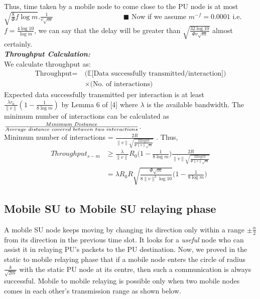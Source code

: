 \documentclass[conference]{IEEEtran}
\begin{document}
Thus, time taken by a mobile node to come close to the PU node is at most $\sqrt{\frac{8}{\Phi}f\log m}.\frac{1}{v\sqrt{m}}\quad\quad\quad\quad\quad\quad\quad\quad\quad\quad\blacksquare$ Now 
if we assume $m^{-f}=0.0001$ i.e.$f=\frac{4\log 10}{\log m}$, we can say that the delay will be greater than $\sqrt{\frac{32\log 10}{\Phi v \sqrt{m}}}$ almost certainly.\\
\emph{\bf Throughput Calculation:}\\
We calculate throughput as:
\vspace{-2mm}
\begin{align*}
\mbox{Throughput}=\ &(\mathbb{E}[\mbox{Data successfully transmitted/interaction])}\\
\ &\times\mbox{(No. of interactions)}
\end{align*}
Expected data successfully transmitted per interaction is at least $\frac{\lambda r_0}{\|v\|}(1-\frac{1}{8\log m})$ by Lemma 6 of [4] where $\lambda$ is the available bandwidth. The minimum 
number of interactions can be calculated as $\frac{Minimum\hspace{1mm}Distance}{Average\hspace{1mm}distance\hspace{1mm}covered\hspace{1mm}between\hspace{1mm}two\hspace{1mm}interactions}$.
\\Minimum number of interactions = $\frac{2R}{{\|v\|}\sqrt{\frac{32log 10}{\Phi{\|v\|} \sqrt{m}}}}$ . Thus,
\begin{align*}
Throughput_{s-m}&\geq\frac{\lambda}{\|v\|}R_0\big(1-\frac{1}{8\log m}\big)\frac{2R}{{\|v\|}\sqrt{\frac{32log 10}{\Phi{\|v\|} \sqrt{m}}}}\\
&=\lambda R_0R \sqrt{\frac{\Phi\sqrt{m}}{8\|v\|^3\log 10}}\big(1-\frac{1}{8\log m}\big)
\end{align*}



\subsection{Mobile SU to Mobile SU relaying phase}
A mobile SU node keeps moving by changing its direction only within a range  $\pm \frac{\alpha}{2}$ from its direction in the previous time slot. It looks for a \textit{useful} node who can assist it in relaying PU's packets to the PU destination. Now, we proved in the static to mobile relaying phase that if a mobile node enters the circle of radius $\frac{k}{\sqrt{2m}}$ with the static PU node at its centre, then such a communication is always successful. Mobile to mobile relaying is possible only when two mobile nodes comes in each other's transmission range as shown below.
\end{document}
